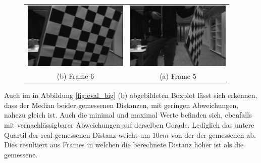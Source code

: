 	\begin{figure}[h]
		\centering
		\begin{tabular}{cc}
		\includegraphics[width=5cm]{img/evaluation/big_5_left}&
		\includegraphics[width=5cm]{img/evaluation/big_6_left}\\
		(b) Frame 6 &  (a) Frame 5
		\end{tabular}
		\caption{}
	    \label{fig:eval_big_fails}
	\end{figure}

	Auch im in Abbildung \ref{fig:eval_big} (b) abgebildeten Boxplot lässt sich erkennen, dass der Median beider gemessenen Distanzen, mit geringen Abweichungen, nahezu gleich ist. Auch die minimal und maximal Werte befinden sich, ebenfalls mit vernachlässigbarer Abweichungen auf derselben Gerade. Lediglich das untere Quartil der real gemessenen Distanz weicht um $10 cm$ von der der gemessenen ab. Dies resultiert aus Frames in welchen die berechnete Distanz höher ist als die gemessene.\\
	

